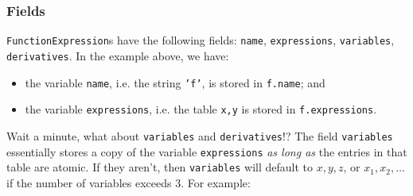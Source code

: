 \documentclass{article}
\begin{document}
\subsubsection*{Fields}
\texttt{FunctionExpression}s have the following fields: \texttt{name}, \texttt{expressions}, \texttt{variables}, \texttt{derivatives}. In the example above, we have:
\begin{itemize}
    \item the variable \texttt{name}, i.e. the string \texttt{'f'}, is stored in \texttt{f.name}; and
    \item the variable \texttt{expressions}, i.e. the table \texttt{{x,y}} is stored in \texttt{f.expressions}.
\end{itemize}

Wait a minute, what about \texttt{variables} and \texttt{derivatives}!? The field \texttt{variables} essentially stores a copy of the variable \texttt{expressions} \textit{as long as} the entries in that table are atomic. If they aren't, then \texttt{variables} will default to $x,y,z$, or $x_1,x_2,\ldots$ if the number of variables exceeds $3$. For example:
\end{document}
